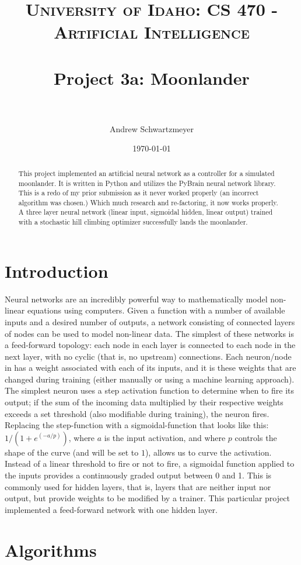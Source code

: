 \documentclass[12pt, article]{scrartcl}
\title{	
\normalfont \normalsize 
\textsc{University of Idaho: CS 470 - Artificial Intelligence} \\ [25pt]
\horrule{0.5pt} \\[0.4cm]
\huge Project 3a: Moonlander\\
\horrule{2pt} \\[0.5cm]
}
\author{Andrew Schwartzmeyer}
\date{\normalsize\today}
\begin{document}
\maketitle 
\begin{abstract}
This project implemented an artificial neural network as a controller for a simulated moonlander. It is written in Python and utilizes the PyBrain neural network library. This is a redo of my prior submission as it never worked properly (an incorrect algorithm was chosen.) Which much research and re-factoring, it now works properly. A three layer neural network (linear input, sigmoidal hidden, linear output) trained with a stochastic hill climbing optimizer successfully lands the moonlander.
\end{abstract}
\pagebreak

\section{Introduction}
Neural networks are an incredibly powerful way to mathematically model non-linear equations using computers. Given a function with a number of available inputs and a desired number of outputs, a network consisting of connected layers of nodes can be used to model non-linear data. The simplest of these networks is a feed-forward topology: each node in each layer is connected to each node in the next layer, with no cyclic (that is, no upstream) connections. Each neuron/node in has a weight associated with each of its inputs, and it is these weights that are changed during training (either manually or using a machine learning approach). The simplest neuron uses a step activation function to determine when to fire its output; if the sum of the incoming data multiplied by their respective weights exceeds a set threshold (also modifiable during training), the neuron fires. Replacing the step-function with a sigmoidal-function that looks like this: $1/(1+e^(-a/p))$, where $a$ is the input activation, and where $p$ controls the shape of the curve (and will be set to $1$), allows us to curve the activation. Instead of a linear threshold to fire or not to fire, a sigmoidal function applied to the inputs provides a continuously graded output between 0 and 1. This is commonly used for hidden layers, that is, layers that are neither input nor output, but provide weights to be modified by a trainer. This particular project implemented a feed-forward network with one hidden layer.

\section{Algorithms}
\end{document}
